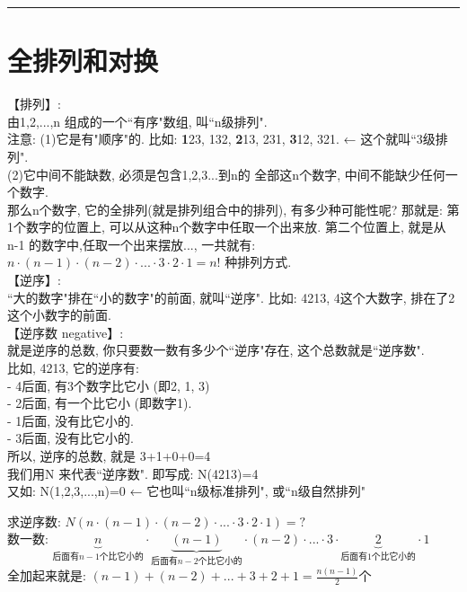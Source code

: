 \documentclass[UTF8]{ctexart}
\begin{document}
	

	\hrule

	
	\section{全排列和对换}
	
	【排列】:\\
	由1,2,...,n 组成的一个``有序"数组, 叫``n级排列".\\
	注意: (1)它是有"顺序"的. 比如: \textbf{1}23, 132, \textbf{2}13, 231, \textbf{3}12, 321.  ← 这个就叫``3级排列".\\
	
	(2)它中间不能缺数, 必须是包含1,2,3...到n的 全部这n个数字, 中间不能缺少任何一个数字. \\
	那么n个数字, 它的全排列(就是排列组合中的排列), 有多少种可能性呢? 那就是: 第1个数字的位置上, 可以从这种n个数字中任取一个出来放. 第二个位置上, 就是从 n-1 的数字中,任取一个出来摆放..., 一共就有: $n\cdot \left( n-1 \right) \cdot \left( n-2 \right) \cdot ...\cdot 3\cdot 2\cdot 1 = n!	$ 种排列方式.\\
	
	
	【逆序】:\\
	``大的数字"排在``小的数字"的前面, 就叫``逆序". 比如: 4213,  4这个大数字, 排在了2这个小数字的前面. \\
	
	
	【逆序数 negative】:\\	
	就是逆序的总数, 你只要数一数有多少个``逆序"存在, 这个总数就是``逆序数".\\
	比如, 4213, 它的逆序有: \\
	- 4后面, 有3个数字比它小 (即2, 1, 3) \\
	- 2后面, 有一个比它小 (即数字1). \\
	- 1后面, 没有比它小的. \\
	- 3后面, 没有比它小的. \\
	所以, 逆序的总数, 就是 3+1+0+0=4 \\
	
	我们用N 来代表``逆序数". 即写成: N(4213)=4 \\
	又如: N(1,2,3,...,n)=0 ← 它也叫``n级标准排列", 或``n级自然排列"\\
	
	\begin{myEnvSample}
	求逆序数: $	N\left( n\cdot \left( n-1 \right) \cdot \left( n-2 \right) \cdot ...\cdot 3\cdot 2\cdot 1 \right) =?	$\\
	数一数: $	\underset{\text{后面有}n-1\text{个比它小的}}{\underbrace{n}}\cdot \underset{\text{后面有}n-2\text{个比它小的}}{\underbrace{\left( n-1 \right) }}\cdot \left( n-2 \right) \cdot ...\cdot 3\cdot \underset{\text{后面有1个比它小的}}{\underbrace{2}}\cdot 1		$ \\
	全加起来就是: $\left( n-1 \right) +\left( n-2 \right) +...+3+2+1=\frac{n\left( n-1 \right)}{2}$个	
	\end{myEnvSample}
\end{document}
